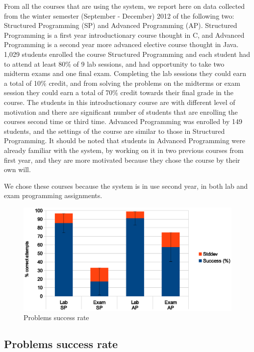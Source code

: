 \documentclass{llncs}
\begin{document}
From all the courses that are using the system, we report here on
data collected from the winter semester (September - December) 2012 of the following
two: Structured Programming (SP) and Advanced Programming (AP). Structured
Programming is a first year introductionary course thought in C, and Advanced
Programming is a second year more advanced elective course thought in Java.
1,029 students enrolled the course Structured Programming and each student had
to attend at least 80\% of 9 lab sessions, and had opportunity to take two midterm exams
and one final exam. Completing the lab sessions they could earn a total of 10\%
credit, and from solving the problems on the midterms or exam session they could
earn a total of 70\% credit towards their final grade in the course. The
students in this introductionary course are with different level of motivation
and there are significant number of students that are enrolling the courses
second time or third time. Advanced Programming was enrolled by 149 students,
and the settings of the course are similar to those in Structured Programming.
It should be noted that students in Advanced Programming were already familiar
with the system, by working on it in two previous courses from first year, and
they are more motivated because they chose the course by their own will.

We chose these courses because the system is in use second year, in both lab and
exam programming assignments.
\begin{figure}[htb]
\centering
\includegraphics[width=.99\textwidth]{code_usage/problems_success_rate}
\caption{Problems success rate}
\label{fig:problems_success}
\end{figure}

\subsection{Problems success rate}
\end{document}
